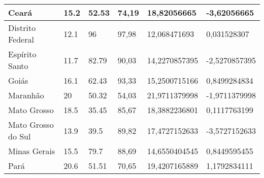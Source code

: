 \begin{table}[h]
{\begin{tabular}{|l|l|l|l|l|l|}
Ceará               & 15.2                                              & 52.53                                                 & 74,19                                                     & 18,82056665                                        & -3,62056665               \\ \hline
Distrito Federal    & 12.1                                              & 96                                                    & 97,98                                                     & 12,068471693                                       & 0,031528307               \\ \hline
Espírito Santo      & 11.7                                              & 82.79                                                 & 90,03                                                     & 14,2270857395                                      & -2,5270857395             \\ \hline
Goiás               & 16.1                                              & 62.43                                                 & 93,33                                                     & 15,2500715166                                      & 0,8499284834              \\ \hline
Maranhão            & 20                                                & 50.32                                                 & 54,03                                                     & 21,9711379998                                      & -1,9711379998             \\ \hline
Mato Grosso         & 18.5                                              & 35.45                                                 & 85,67                                                     & 18,3882236801                                      & 0,1117763199              \\ \hline
Mato Grosso do Sul  & 13.9                                              & 39.5                                                  & 89,82                                                     & 17,4727152633                                      & -3,5727152633             \\ \hline
Minas Gerais        & 15.5                                              & 79.7                                                  & 88,69                                                     & 14,6550404545                                      & 0,8449595455              \\ \hline
Pará                & 20.6                                              & 51.51                                                 & 70,65                                                     & 19,4207165889                                      & 1,1792834111              \\ \hline

\end{tabular}}
\end{table}

